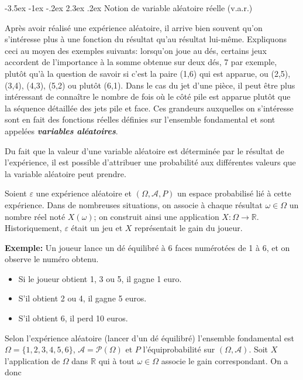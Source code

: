 \documentclass[]{book}
\makeatletter
\renewcommand\section{\@startsection {section}{1}{\z@}%
                                   {-3.5ex \@plus -1ex \@minus -.2ex}%
                                   {2.3ex \@plus.2ex}%
                                   {\normalfont\Large\bfseries\color{ForestGreen}}}
\theoremstyle{magentacolor}
\theoremstyle{proprie}
\theoremstyle{exstyle}
\theoremstyle{exostyle}
\theoremstyle{definition}
\theoremstyle{definition}
\theoremstyle{definition}
\theoremstyle{remark}
\makeatother
\begin{document}
\hypertarget{notion-de-variable-aleatoire-reelle-v.a.r.}{%
\section{Notion de variable aléatoire réelle (v.a.r.)}\label{notion-de-variable-aleatoire-reelle-v.a.r.}}

Après avoir réalisé une expérience aléatoire, il arrive bien souvent
qu'on s'intéresse plus à une fonction du résultat qu'au résultat
lui-même. Expliquons ceci au moyen des exemples suivants: lorsqu'on joue
au dés, certains jeux accordent de l'importance à la somme obtenue sur
deux dés, 7 par exemple, plutôt qu'à la question de savoir si c'est la
paire (1,6) qui est apparue, ou (2,5), (3,4), (4,3), (5,2) ou plutôt
(6,1). Dans le cas du jet d'une pièce, il peut être plus intéressant de
connaître le nombre de fois où le côté pile est apparue plutôt que la
séquence détaillée des jets pile et face. Ces grandeurs auxquelles on
s'intéresse sont en fait des fonctions réelles définies sur l'ensemble
fondamental et sont appelées \textbf{\emph{variables aléatoires}}.

Du fait que la valeur d'une variable aléatoire est déterminée par le
résultat de l'expérience, il est possible d'attribuer une probabilité
aux différentes valeurs que la variable aléatoire peut prendre.

Soient \(\varepsilon\) une expérience aléatoire et
\((\Omega,\mathcal{A},P)\) un espace probabilisé lié à cette expérience.
Dans de nombreuses situations, on associe à chaque résultat
\(\omega \in \Omega\) un nombre réel noté \(X(\omega)\); on construit ainsi
une application \(X : \Omega \rightarrow \mathbb{R}\). Historiquement,
\(\varepsilon\) était un jeu et \(X\) représentait le gain du joueur.

\textbf{Exemple:} Un joueur lance un dé équilibré à 6 faces numérotées de 1 à 6, et on
observe le numéro obtenu.

\begin{itemize}
\item
  Si le joueur obtient 1, 3 ou 5, il gagne 1 euro.
\item
  S'il obtient 2 ou 4, il gagne 5 euros.
\item
  S'il obtient 6, il perd 10 euros.
\end{itemize}

Selon l'expérience aléatoire (lancer d'un dé équilibré) l'ensemble
fondamental est \(\Omega = \{1,2,3,4,5,6\}\),
\(\mathcal{A} = \mathcal{P}(\Omega)\) et \(P\) l'équiprobabilité sur
\((\Omega,\mathcal{A})\). Soit \(X\) l'application de \(\Omega\) dans
\(\mathbb{R}\) qui à tout \(\omega \in \Omega\) associe le gain
correspondant. On a donc
\end{document}
